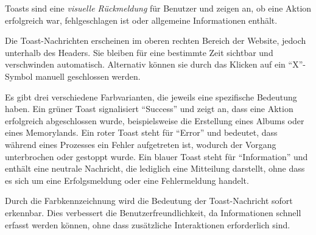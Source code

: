 Toasts sind eine \emph{visuelle Rückmeldung} für Benutzer und zeigen an, ob eine Aktion 
erfolgreich war, fehlgeschlagen ist oder allgemeine Informationen enthält.  

Die Toast-Nachrichten erscheinen im oberen rechten Bereich der Website, jedoch 
unterhalb des Headers. Sie bleiben für eine bestimmte Zeit sichtbar und verschwinden 
automatisch. Alternativ können sie durch das Klicken auf ein ``X''-Symbol manuell 
geschlossen werden.  

Es gibt drei verschiedene Farbvarianten, die jeweils eine spezifische Bedeutung 
haben. Ein grüner Toast signalisiert ``Success'' und zeigt an, dass eine Aktion 
erfolgreich abgeschlossen wurde, beispielsweise die Erstellung eines Albums oder 
eines Memorylands. Ein roter Toast steht für ``Error'' und bedeutet, dass während 
eines Prozesses ein Fehler aufgetreten ist, wodurch der Vorgang unterbrochen oder 
gestoppt wurde. Ein blauer Toast steht für ``Information'' und enthält eine neutrale 
Nachricht, die lediglich eine Mitteilung darstellt, ohne dass es sich um eine 
Erfolgsmeldung oder eine Fehlermeldung handelt.

Durch die Farbkennzeichnung wird die Bedeutung der Toast-Nachricht sofort erkennbar. 
Dies verbessert die Benutzerfreundlichkeit, da Informationen schnell erfasst werden 
können, ohne dass zusätzliche Interaktionen erforderlich sind.


